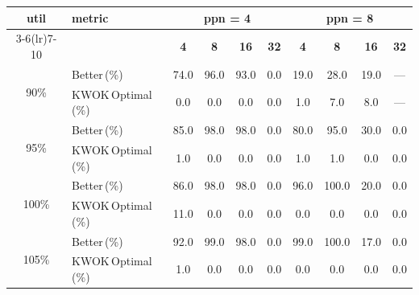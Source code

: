 \begin{tabular}{@{}c l *{8}{c}@{}}
\toprule
\multirow{2}{*}{\textbf{util}} & \multirow{2}{*}{\textbf{metric}} &\multicolumn{4}{c}{\textbf{ppn = 4}} & \multicolumn{4}{c}{\textbf{ppn = 8}}\\
\cmidrule(lr){3-6}\cmidrule(lr){7-10}
 &  & \textbf{4} & \textbf{8} & \textbf{16} & \textbf{32} & \textbf{4} & \textbf{8} & \textbf{16} & \textbf{32}\\
\midrule
\multirow{2}{*}{90\%}
& Better\,(\%) & 74.0 & 96.0 & 93.0 & 0.0 & 19.0 & 28.0 & 19.0 & \multicolumn{1}{c}{—} \\
& KWOK\,Optimal\,(\%) & 0.0 & 0.0 & 0.0 & 0.0 & 1.0 & 7.0 & 8.0 & \multicolumn{1}{c}{—} \\
\midrule
\multirow{2}{*}{95\%}
& Better\,(\%) & 85.0 & 98.0 & 98.0 & 0.0 & 80.0 & 95.0 & 30.0 & 0.0 \\
& KWOK\,Optimal\,(\%) & 1.0 & 0.0 & 0.0 & 0.0 & 1.0 & 1.0 & 0.0 & 0.0 \\
\midrule
\multirow{2}{*}{100\%}
& Better\,(\%) & 86.0 & 98.0 & 98.0 & 0.0 & 96.0 & 100.0 & 20.0 & 0.0 \\
& KWOK\,Optimal\,(\%) & 11.0 & 0.0 & 0.0 & 0.0 & 0.0 & 0.0 & 0.0 & 0.0 \\
\midrule
\multirow{2}{*}{105\%}
& Better\,(\%) & 92.0 & 99.0 & 98.0 & 0.0 & 99.0 & 100.0 & 17.0 & 0.0 \\
& KWOK\,Optimal\,(\%) & 1.0 & 0.0 & 0.0 & 0.0 & 0.0 & 0.0 & 0.0 & 0.0 \\
\bottomrule
\end{tabular}
